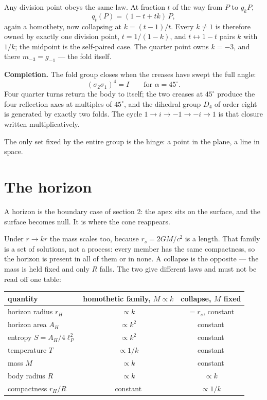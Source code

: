 \documentclass[11pt,fleqn]{article}
\begin{document}
Any division point obeys the same law. At fraction $t$ of the way from $P$ to $g_kP$,
\begin{equation}
q_t(P) = (1 - t + tk)\,P,
\end{equation}
again a homothety, now collapsing at $k = (t - 1)/t$. Every $k \neq 1$ is therefore owned by exactly
one division point, $t = 1/(1-k)$, and $t \leftrightarrow 1-t$ pairs $k$ with $1/k$; the midpoint is
the self-paired case. The quarter point owns $k = -3$, and there $m_{-3} = g_{-1}$ --- the fold
itself.

\textbf{Completion.} The fold group closes when the creases have swept the full angle:
\begin{equation}
(\sigma_2\sigma_1)^4 = I \qquad \text{for } \alpha = 45^\circ.
\end{equation}
Four quarter turns return the body to itself; the two creases at $45^\circ$ produce the four
reflection axes at multiples of $45^\circ$, and the dihedral group $D_4$ of order eight is generated
by exactly two folds. The cycle
$1 \to i \to -1 \to -i \to 1$ is that closure written multiplicatively.

The only set fixed by the entire group is the hinge: a point in the plane, a line in space.

\section{The horizon}

A horizon is the boundary case of section 2: the apex sits on the surface, and the surface becomes
null. It is where the cone reappears.

Under $r \to kr$ the mass scales too, because $r_s = 2GM/c^2$ is a length. That family is a set of
solutions, not a process: every member has the same compactness, so the horizon is present in all
of them or in none. A collapse is the opposite --- the mass is held fixed and only $R$ falls. The
two give different laws and must not be read off one table:

\begin{table}[H]
\centering
\small
\begin{tabular}{@{}lcc@{}}
\toprule
quantity & homothetic family, $M \propto k$ & collapse, $M$ fixed \\
\midrule
horizon radius $r_H$ & $\propto k$ & $= r_s$, constant \\
horizon area $A_H$ & $\propto k^2$ & constant \\
entropy $S = A_H/4\ell_P^2$ & $\propto k^2$ & constant \\
temperature $T$ & $\propto 1/k$ & constant \\
mass $M$ & $\propto k$ & constant \\
body radius $R$ & $\propto k$ & $\propto k$ \\
compactness $r_H/R$ & constant & $\propto 1/k$ \\
\bottomrule
\end{tabular}
\end{table}
\end{document}
